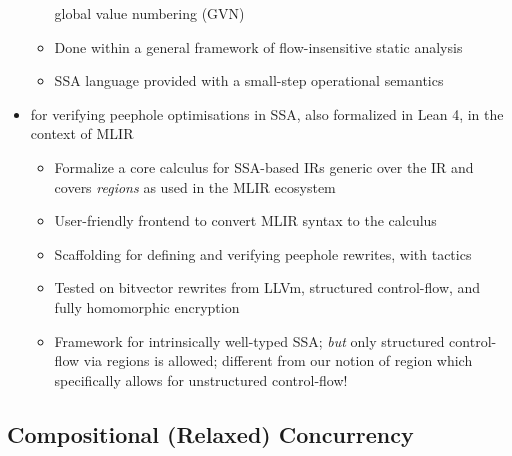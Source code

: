 \documentclass[acmsmall,screen,review]{acmart}
\begin{document}
\begin{itemize}
\begin{itemize}
    global value numbering (GVN) \citet{rosen-gvn-1988}
    \item Done within a general framework of flow-insensitive static analysis
    \item SSA language provided with a small-step operational semantics
  \end{itemize}
  \item \citet{siddharth-24-peephole} for verifying peephole optimisations in SSA, also formalized
  in Lean 4, in the context of MLIR
  \begin{itemize}
    \item Formalize a core calculus for SSA-based IRs generic over the IR and covers \emph{regions}
    as used in the MLIR ecosystem
    \item User-friendly frontend to convert MLIR syntax to the calculus
    \item Scaffolding for defining and verifying peephole rewrites, with tactics
    \item Tested on bitvector rewrites from LLVm, structured control-flow, and fully homomorphic
    encryption
    \item Framework for intrinsically well-typed SSA; \emph{but} only structured control-flow via
    regions is allowed; different from our notion of region which specifically allows for
    unstructured control-flow!
  \end{itemize}
\end{itemize}

\subsection{Compositional (Relaxed) Concurrency}
\end{document}
